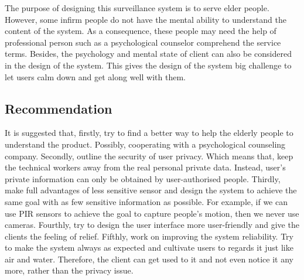 \documentclass[11pt, a4paper]{article}
\begin{document}
The purpose of designing this surveillance system is to serve elder people. However, some infirm people do not have the mental ability to understand the content of the system. As a consequence, these people may need the help of professional person such as a psychological counselor comprehend the service terms. Besides, the psychology and mental state of client can also be considered in the design of the system. This gives the design of the system big challenge to let users calm down and get along well with them.





\subsection{Recommendation}


It is suggested that, firstly, try to find a better way to help the elderly people to understand the product. Possibly, cooperating with a psychological counseling company. Secondly, outline the security of user privacy. Which means that, keep the technical workers away from the real personal private data. Instead, user's private information can only be obtained by user-authorised people. Thirdly, make full advantages of less sensitive sensor and design the system to achieve the same goal with as few sensitive information as possible. For example, if we can use PIR sensors to achieve the goal to capture people's motion, then we never use cameras. Fourthly, try to design the user interface more user-friendly and give the clients the feeling of relief. Fifthly, work on improving the system reliability. Try to make the system always as expected and cultivate users to regards it just like air and water. Therefore, the client can get used to it and not even notice it any more, rather than the privacy issue.




\newpage
\end{document}
